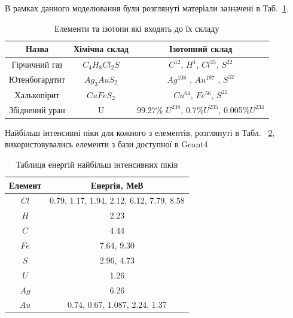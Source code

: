 \documentclass[a4paper, 14pt]{article}
\numberwithin{equation}{section}
\numberwithin{table}{section}
\begin{document}
В рамках данного моделювання були розглянуті матеріали зазначені в Таб.~\ref{tabl:Materials}.
\begin{table}[h]
	\centering
	\caption{Елементи та ізотопи які входять до їх складу} 
	\begin{tabular}{|c|c|c|}
		\hline
		Назва & Хімічна склад & Ізотопний склад \\
		\hline
		Гірчичний газ & $C_4H_8Cl_2S$ & $C^{12}$, 	$H^1$, $Cl^{35}$, $S^{22}$ \\
		\hline
		Ютенбогардтит & $Ag_3AuS_2$ & $Ag^{108}$ , $Au^{197}$ , $S^{32}$ \\
		\hline
		Халькопірит & $CuFeS_2$ & $Cu^{64}$, $Fe^{56}$, $S^{22}$ \\
		\hline
		Збіднений уран & U & 99.27\% $U^{238}$, 0.7\%$U^{235}$, 0.005\%$U^{234}$\\
		\hline
	\end{tabular}
	\label{tabl:Materials}
\end{table}

Найбільш інтенсивні піки для кожного з елементів, розглянуті в Табл. ~\ref{tabl:ElementsEnergy}, використовувались елементи з бази доступної в Geant4
\begin{table}[h]
	\centering
	\caption{Таблиця енергій найбільш інтенсивних піків} 
	\begin{tabular}{|c|c|} 
		\hline
		Елемент& Енергія, МеВ \\
		\hline
		$Cl$ & 0.79, 1.17, 1.94, 2.12, 6.12, 7.79, 8.58 \\
		\hline
		$H$ & 2.23 \\
		\hline
		$C$ & 4.44 \\
		\hline
		$Fe$ & 7.64, 9.30 \\		
		\hline
		$S$ & 2.96, 4.73 \\
		\hline
		$U$ & 1.26\\
		\hline
		$Ag$ & 6.26 \\
		\hline
		$Au$ &  0.74, 0.67, 1.087, 2.24, 1.37  \\
		
		\hline
	\end{tabular}
	\label{tabl:ElementsEnergy}
\end{table}
	
\end{document}
